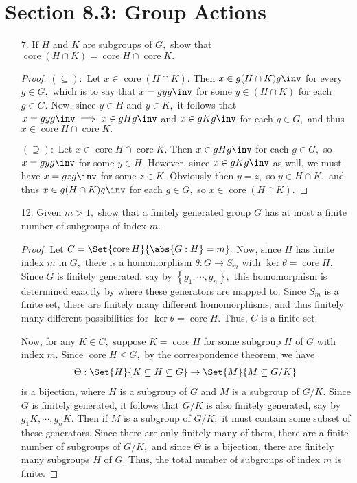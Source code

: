 \documentclass{article}
\DeclareMathOperator{\core}{core}
\begin{document}
\begin{itemize}
		
\end{itemize}

\section*{Section 8.3: Group Actions}

\begin{itemize}
	\item[7.] If $H$ and $K$ are subgroups of $G,$ show that $\core(H\cap K)=\core H\cap \core K.$
		\begin{proof}
			$(\subseteq):$ Let $x\in \core(H\cap K).$ Then $x\in g(H\cap K)g\inv$ for every $g\in G,$ which is to say that $x=gyg\inv$ for some $y\in (H\cap K)$ for each $g\in G.$ Now, since $y\in H$ and $y\in K,$ it follows that $x=gyg\inv\implies x\in gHg\inv$ and $x\in gKg\inv$ for each $g\in G,$ and thus $x\in \core H\cap \core K.$

			$(\supseteq):$ Let $x\in \core H\cap \core K.$ Then $x\in gHg\inv$ for each $g\in G,$ so $x= gyg\inv$ for some $y\in H.$ However, since $x\in gKg\inv$ as well, we must have $x=gzg\inv$ for some $z\in K.$ Obviously then $y=z,$ so $y\in H\cap K,$ and thus $x\in g(H\cap K)g\inv$ for each $g\in G,$ so $x\in \core(H\cap K).$
		\end{proof}

		\newpage
	\item[12.] Given $m>1,$ show that a finitely generated group $G$ has at most a finite number of subgroups of index $m.$
		\begin{proof}	
			Let $C=\Set{\core H}{\abs{G:H}=m}.$ Now, since $H$ has finite index $m$ in $G,$ there is a homomorphism $\theta:G\to S_m$ with $\ker \theta = \core H.$ Since $G$ is finitely generated, say by $\left\{ g_1, \cdots, g_n \right\},$ this homomorphism is determined exactly by where these generators are mapped to. Since $S_m$ is a finite set, there are finitely many different homomorphisms, and thus finitely many different possibilities for $\ker \theta = \core H.$ Thus, $C$ is a finite set. 

			Now, for any $K\in C,$ suppose $K=\core H$ for some subgroup $H$ of $G$ with index $m.$ Since $\core H\unlhd G,$ by the correspondence theorem, we have
			\begin{align*}
				\Theta:\Set{H}{K\subseteq H\subseteq G} \to \Set{M}{M\subseteq G/K}
			\end{align*}
			is a bijection, where $H$ is a subgroup of $G$ and $M$ is a subgroup of $G/K.$ Since $G$ is finitely generated, it follows that $G/K$ is also finitely generated, say by $g_1K, \cdots, g_n K.$ Then if $M$ is a subgroup of $G/K,$ it must contain some subset of these generators. Since there are only finitely many of them, there are a finite number of subgroups of $G/K,$ and since $\Theta$ is a bijection, there are finitely many subgroups $H$ of $G.$ Thus, the total number of subgroups of index $m$ is finite.
		\end{proof}


\end{itemize}
\end{document}
